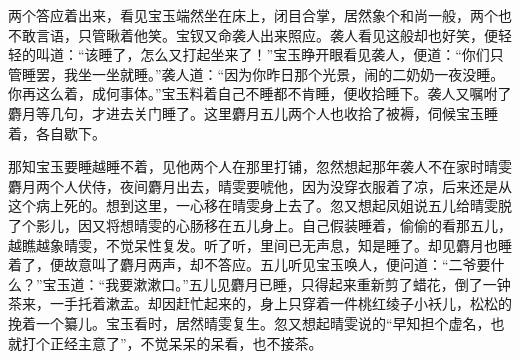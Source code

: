 \begin{parag}
    两个答应着出来，看见宝玉端然坐在床上，闭目合掌，居然象个和尚一般，两个也不敢言语，只管瞅着他笑。宝钗又命袭人出来照应。袭人看见这般却也好笑，便轻轻的叫道：“该睡了，怎么又打起坐来了！”宝玉睁开眼看见袭人，便道：“你们只管睡罢，我坐一坐就睡。”袭人道：“因为你昨日那个光景，闹的二奶奶一夜没睡。你再这么着，成何事体。”宝玉料着自己不睡都不肯睡，便收拾睡下。袭人又嘱咐了麝月等几句，才进去关门睡了。这里麝月五儿两个人也收拾了被褥，伺候宝玉睡着，各自歇下。
\end{parag}


\begin{parag}
    那知宝玉要睡越睡不着，见他两个人在那里打铺，忽然想起那年袭人不在家时晴雯麝月两个人伏侍，夜间麝月出去，晴雯要唬他，因为没穿衣服着了凉，后来还是从这个病上死的。想到这里，一心移在晴雯身上去了。忽又想起凤姐说五儿给晴雯脱了个影儿，因又将想晴雯的心肠移在五儿身上。自己假装睡着，偷偷的看那五儿，越瞧越象晴雯，不觉呆性复发。听了听，里间已无声息，知是睡了。却见麝月也睡着了，便故意叫了麝月两声，却不答应。五儿听见宝玉唤人，便问道：“二爷要什么？”宝玉道：“我要漱漱口。”五儿见麝月已睡，只得起来重新剪了蜡花，倒了一钟茶来，一手托着漱盂。却因赶忙起来的，身上只穿着一件桃红绫子小袄儿，松松的挽着一个纂儿。宝玉看时，居然晴雯复生。忽又想起晴雯说的“早知担个虚名，也就打个正经主意了”，不觉呆呆的呆看，也不接茶。
\end{parag}


